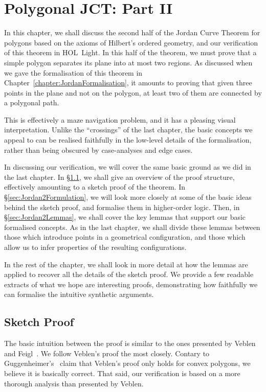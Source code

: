 \chapter{Polygonal JCT: Part II}\label{chapter:JordanVerification2}
In this chapter, we shall discuss the second half of the Jordan Curve Theorem for polygons based on the axioms of Hilbert's ordered geometry, and our verification of this theorem in HOL~Light. In this half of the theorem, we must prove that a simple polygon separates its plane into at most two regions. As discussed when we gave the formalisation of this theorem in Chapter~\ref{chapter:JordanFormalisation}, it amounts to proving that given three points in the plane and not on the polygon, at least two of them are connected by a polygonal path.

This is effectively a maze navigation problem, and it has a pleasing visual interpretation. Unlike the ``crossings'' of the last chapter, the basic concepts we appeal to can be realised faithfully in the low-level details of the formalisation, rather than being obscured by case-analyses and edge cases. 

In discussing our verification, we will cover the same basic ground as we did in the last chapter. In \S\ref{sec:SketchProofJordan2}, we shall give an overview of the proof structure, effectively amounting to a sketch proof of the theorem. In \S\ref{sec:Jordan2Formulation}, we will look more closely at some of the basic ideas behind the sketch proof, and formalise them in higher-order logic. Then, in \S\ref{sec:Jordan2Lemmas}, we shall cover the key lemmas that support our basic formalised concepts. As in the last chapter, we shall divide these lemmas between those which introduce points in a geometrical configuration, and those which allow us to infer properties of the resulting configurations. 

In the rest of the chapter, we shall look in more detail at how the lemmas are applied to recover all the details of the sketch proof. We provide a few readable extracts of what we hope are interesting proofs, demonstrating how faithfully we can formalise the intuitive synthetic arguments.

\section{Sketch Proof}\label{sec:SketchProofJordan2}
The basic intuition between the proof is similar to the ones presented by Veblen~\cite{Veblenphd} and Feigl~\cite{FeiglJordan}. We follow Veblen's proof the most closely. Contary to Guggenheimer's~\cite{GuggenheimerJordanCurve} claim that Veblen's proof only holds for convex polygons, we believe it is basically correct. That said, our verification is based on a more thorough analysis than presented by Veblen.

